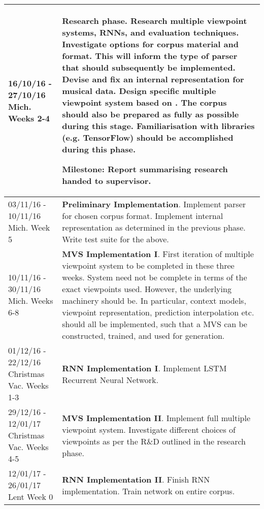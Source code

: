 \documentclass[12pt,a4paper,twoside]{article}
\begin{document}
\begin{tabular}{ p{4cm} | p{11cm} } \hline 

16/10/16 - 27/10/16 Mich. Weeks 2-4 & \textbf{Research phase}.
Research multiple viewpoint systems, RNNs, and evaluation techniques.
Investigate options for corpus material and format. This will inform the type of
parser that should subsequently be implemented. Devise and fix an internal
representation for musical data. Design specific multiple viewpoint system based
on \cite{whorley2013phd}. The corpus should also be prepared as fully as
possible during this stage. Familiarisation with libraries (e.g. TensorFlow)
should be accomplished during this phase.

\textbf{Milestone}: Report summarising research handed to supervisor.
\\ \hline
03/11/16 - 10/11/16 \newline Mich. Week 5 & \textbf{Preliminary Implementation}. 
Implement parser for chosen corpus format. Implement internal representation as
determined in the previous phase. Write test suite for the above. 
\\ \hline
10/11/16 - 30/11/16 \newline Mich. Weeks 6-8 & \textbf{MVS Implementation I}.
First iteration of multiple viewpoint system to be completed in these three
weeks. System need not be complete in terms of the exact viewpoints used.
However, the underlying machinery should be. In particular, context models,
viewpoint representation, prediction interpolation etc. should all be
implemented, such that a MVS can be constructed, trained, and used for
generation.
\\ \hline
01/12/16 - 22/12/16 \newline Christmas Vac. Weeks 1-3 & \textbf{RNN Implementation I}.
Implement LSTM Recurrent Neural Network. 
\\ \hline
29/12/16 - 12/01/17 \newline Christmas Vac. Weeks 4-5 & \textbf{MVS Implementation II}.
Implement full multiple viewpoint system. Investigate different choices of
viewpoints as per the R\&D outlined in the research phase. 
\\ \hline
12/01/17 - 26/01/17 \newline Lent Week 0 & \textbf{RNN Implementation II}.
Finish RNN implementation. Train network on entire corpus.
\\ \hline

\end{tabular}

\printbibliography
\end{document}

